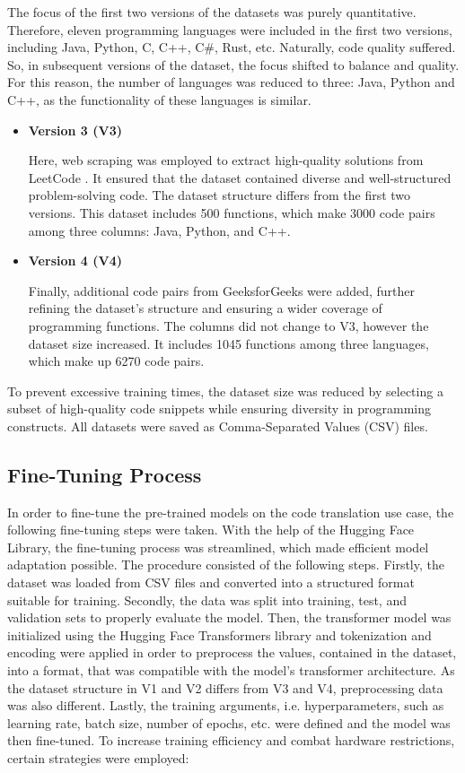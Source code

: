 \documentclass[conference]{IEEEtran}
\begin{document}
The focus of the first two versions of the datasets was purely quantitative. Therefore, eleven programming languages were included in the first two versions, including Java, Python, C, C++, C\#, Rust, etc. Naturally, code quality suffered. 
So, in subsequent versions of the dataset, the focus shifted to balance and quality. For this reason, the number of languages was reduced to three: Java, Python and C++, as the functionality of these languages is similar.

\begin{itemize}
    \item \textbf{Version 3 (V3)} 
        
        Here, web scraping was employed to extract high-quality solutions from LeetCode \cite{b13}. It ensured that the dataset contained diverse and well-structured problem-solving code.
        The dataset structure differs from the first two versions. This dataset includes 500 functions, which make 3000 code pairs among three columns: Java, Python, and C++.

    \item \textbf{Version 4 (V4)}
        
        Finally, additional code pairs from GeeksforGeeks were added, further refining the dataset’s structure and ensuring a wider coverage of programming functions.
        The columns did not change to V3, however the dataset size increased. It includes 1045 functions among three languages, which make up 6270 code pairs.
    
\end{itemize}

To prevent excessive training times, the dataset size was reduced by  selecting a subset of high-quality code snippets while ensuring diversity in programming constructs. All datasets were saved as Comma-Separated Values (CSV) files.

\subsection{Fine-Tuning Process}\label{fine-tuning}
In order to fine-tune the pre-trained models on the code translation use case, the following fine-tuning steps were taken. With the help of the Hugging Face Library, the fine-tuning process was streamlined, which made efficient model adaptation possible. The procedure consisted of the following steps.
Firstly, the dataset was loaded from CSV files and converted into a structured format suitable for training. Secondly, the data was split into training, test, and validation sets to properly evaluate the model. Then, the transformer model was initialized using the Hugging Face Transformers library and tokenization and encoding were applied in order to preprocess the values, contained in the dataset, into a format, that was compatible with the model's transformer architecture. As the dataset structure in V1 and V2 differs from V3 and V4, preprocessing data was also different. Lastly, the training arguments, i.e. hyperparameters, such as learning rate, batch size, number of epochs, etc. were defined and the model was then fine-tuned. 
To increase training efficiency and combat hardware restrictions, certain strategies were employed:
\end{document}
